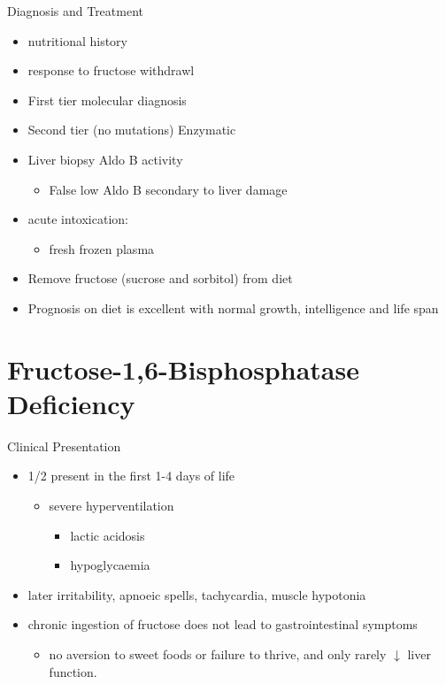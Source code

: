 \documentclass[presentation, smaller]{beamer}
\begin{document}
\begin{frame}[label={sec:org6909ef7}]{Diagnosis and Treatment}
\begin{itemize}
\item nutritional history
\item response to fructose withdrawl
\item First tier molecular diagnosis
\item Second tier (no mutations) Enzymatic
\item Liver biopsy Aldo B activity
\begin{itemize}
\item False low Aldo B secondary to liver damage
\end{itemize}

\item acute intoxication:
\begin{itemize}
\item fresh frozen plasma
\end{itemize}
\item Remove fructose (sucrose and sorbitol) from diet
\item Prognosis on diet is excellent with normal growth,
intelligence and life span
\end{itemize}
\end{frame}

\section{Fructose-1,6-Bisphosphatase Deficiency}
\label{sec:org1502c8f}
\begin{frame}[label={sec:orgf138f00}]{Clinical Presentation}
\begin{itemize}
\item 1/2 present in the first 1-4 days of life
\begin{itemize}
\item severe hyperventilation
\begin{itemize}
\item lactic acidosis
\item hypoglycaemia
\end{itemize}
\end{itemize}
\item later irritability, apnoeic spells, tachycardia, muscle hypotonia
\item chronic ingestion of fructose does not lead to gastrointestinal symptoms
\begin{itemize}
\item no aversion to sweet foods or failure to thrive, and only rarely \(\downarrow\) liver function.
\end{itemize}
\end{itemize}
\end{frame}
\end{document}
